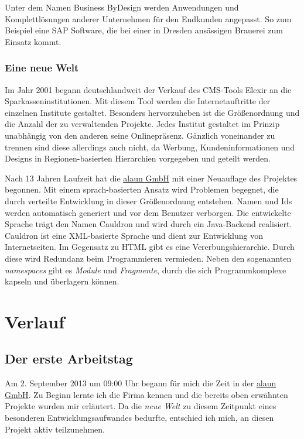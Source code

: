 \documentclass[12pt]{article}
\begin{document}
Unter dem Namen Business ByDesign werden Anwendungen und Komplettlösungen anderer Unternehmen für den
Endkunden angepasst. So zum Beispiel eine SAP Software, die bei einer in Dresden ansässigen Brauerei zum Einsatz kommt.

\subsubsection{Eine neue Welt}

Im Jahr 2001 begann deutschlandweit der Verkauf des CMS-Tools Elexir an die Sparkasseninstitutionen. 
Mit diesem Tool werden die Internetauftritte der einzelnen Institute gestaltet. 
Besonders hervorzuheben ist die Größenordnung und die Anzahl der zu verwaltenden Projekte. Jedes Institut gestaltet im Prinzip unabhängig von den anderen seine Onlinepräsenz.
Gänzlich voneinander zu trennen sind diese allerdings auch nicht, da Werbung, Kundeninformationen und Designs in
Regionen-basierten Hierarchien vorgegeben und geteilt werden.

Nach 13 Jahren Laufzeit hat die \href{https://alaun.de/home/}{alaun GmbH} mit einer Neuauflage des Projektes begonnen.
Mit einem sprach-basierten Ansatz wird Problemen begegnet, die durch verteilte Entwicklung in dieser Größenordnung
entstehen. Namen und Ids werden automatisch generiert und vor dem Benutzer verborgen. 
Die entwickelte Sprache trägt den Namen Cauldron und wird durch ein Java-Backend realisiert.
Cauldron ist eine XML-basierte Sprache und dient zur Entwicklung von Internetseiten.
Im Gegensatz zu HTML gibt es eine Vererbungshierarchie. Durch diese wird Redundanz beim Programmieren vermieden.
Neben den sogenannten \textit{namespaces} gibt es \textit{Module} und \textit{Fragmente}, durch die sich
Programmkomplexe kapseln und überlagern können. 


\section{Verlauf}

\subsection{Der erste Arbeitstag}

Am 2. September 2013 um 09:00 Uhr begann für mich die Zeit in der \href{https://alaun.de/home/}{alaun GmbH}.
Zu Beginn lernte ich die Firma kennen und die bereits oben erwähnten Projekte wurden mir erläutert.
Da die \textit{neue Welt} zu diesem Zeitpunkt eines besonderen Entwicklungsaufwandes bedurfte, entschied ich mich,
an diesen Projekt aktiv teilzunehmen.
\end{document}
